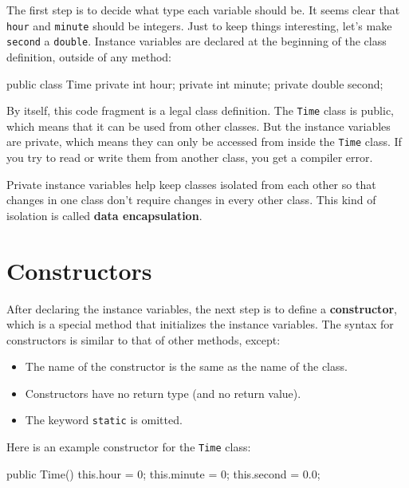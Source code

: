 \documentclass[12pt]{book}
\theoremstyle{exercise}
\newcommand{\java}[1]{\verb"#1"}
\begin{document}
The first step is to decide what type each variable should be.
It seems clear that \java{hour} and \java{minute} should be integers.
Just to keep things interesting, let's make \java{second} a \java{double}.
Instance variables are declared at the beginning of the class definition, outside of any method:

\begin{code}
public class Time {
    private int hour;
    private int minute;
    private double second;
}
\end{code}


By itself, this code fragment is a legal class definition.
The \java{Time} class is public, which means that it can be used from other classes.
But the instance variables are private, which means they can only be accessed from inside the \java{Time} class.
If you try to read or write them from another class, you get a compiler error.


Private instance variables help keep classes isolated from each other so that changes in one class don't require changes in every other class.
This kind of isolation is called {\bf data encapsulation}.


\section{Constructors}


After declaring the instance variables, the next step is to define a {\bf constructor}, which is a special method that initializes the instance variables.
The syntax for constructors is similar to that of other methods, except:

\begin{itemize}
\item The name of the constructor is the same as the name of the class.
\item Constructors have no return type (and no return value).
\item The keyword \java{static} is omitted.
\end{itemize}

Here is an example constructor for the \java{Time} class:

\begin{code}
    public Time() {
        this.hour = 0;
        this.minute = 0;
        this.second = 0.0;
    }
\end{code}
\end{document}
